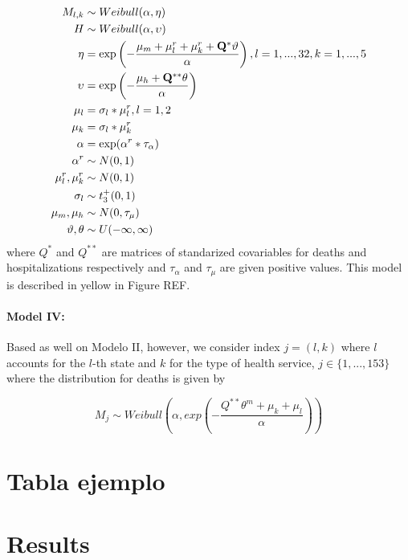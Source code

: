 \documentclass[
]{article}
\begin{document}
\[
\begin{aligned}
 M_{l,k}   &\sim Weibull(\alpha,\mathbf{\eta})\\
 H  &\sim Weibull(\alpha,\mathbf{\upsilon}) \\
 \mathbf{\eta} &= \exp \left(-\frac{\mu_m+\mathbf{\mu}_l^r+\mathbf{\mu}_k^r+\mathbf{Q}^*\mathbf{\vartheta}}{\alpha} \right),\space\space l=1,...,32,\space k=1,...,5\\
 \mathbf{\upsilon} &= \exp\left(-\frac{\mu_h+\mathbf{Q}^{**}\mathbf{\theta}}{\alpha}\right) \\
  \mathbf{\mu}_l&=\sigma_l*\mathbf{\mu}_l^r, \space\space l=1,2 \\
 \mathbf{\mu}_k&=\sigma_l*\mathbf{\mu}_k^r \\
 \alpha&=\exp(\alpha^r*\tau_\alpha) \\
 \alpha^r&\sim N(0,1) \\
 \mu^r_l,\mu^r_k &\sim N(0,1) \\
 \sigma_l&\sim t^+_3(0,1) \\
 \mu_m,\mu_h &\sim N(0,\tau_\mu) \\
 \mathbf{\vartheta},\mathbf{\theta} &\sim U(-\infty,\infty) \\
\end{aligned}
\] where \(Q^*\) and \(Q^{**}\) are matrices of standarized covariables
for deaths and hospitalizations respectively and \(\tau_\alpha\) and
\(\tau_{\mu}\) are given positive values. This model is described in
yellow in Figure REF.

\hypertarget{model-iv}{%
\paragraph{Model IV:}\label{model-iv}}

Based as well on Modelo II, however, we consider index \(j=(l,k)\) where
\(l\) accounts for the \(l\)-th state and \(k\) for the type of health
service, \(j \in \{1,...,153\}\) where the distribution for deaths is
given by

\[M_j \sim Weibull\left(\alpha, exp\left(-\frac{Q^{**}\theta^m+\mu_k+\mu_l}{\alpha} \right) \right)\]

\hypertarget{tabla-ejemplo}{%
\section{Tabla ejemplo}\label{tabla-ejemplo}}

\hypertarget{results}{%
\section{Results}\label{results}}
\end{document}
